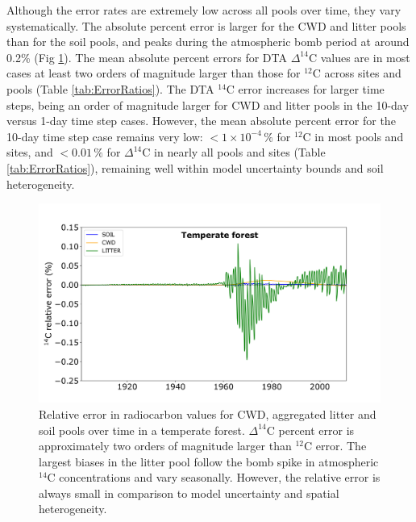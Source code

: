 \documentclass[11pt,a4paper]{article}
\begin{document}
Although the error rates are extremely low across all pools over time, they vary systematically. The absolute percent error is larger for the CWD and litter pools than for the soil pools, and peaks during the atmospheric bomb period at around 0.2\% (Fig \ref{fig:10dayErrorOverTime}). The mean absolute percent errors for DTA $\Delta^{14}$C values are in most cases at least two orders of magnitude larger than those for $^{12}$C across sites and pools (Table \ref{tab:ErrorRatios}). The DTA $^{14}$C error increases for larger time steps, being an order of magnitude larger for CWD and litter pools in the 10-day versus 1-day time step cases. However, the mean absolute percent error for the 10-day time step case remains very low: $< 1 \times 10^{-4}\,\%$ for $^{12}$C in most pools and sites, and $<0.01\,\%$ for $\Delta^{14}$C in nearly all pools and sites (Table \ref{tab:ErrorRatios}), remaining well within model uncertainty bounds and soil heterogeneity.

\begin{figure}[htbp]
        \centering 
        \includegraphics[width=1.0\linewidth]{figs/C14_through_time_rel_err_10_updatedLabel.png}
        \caption{Relative error in radiocarbon values for CWD, aggregated litter and soil pools over time in a temperate forest. $\Delta^{14}$C percent error is approximately two orders of magnitude larger than $^{12}$C error. The largest biases in the litter pool follow the bomb spike in atmospheric $^{14}$C concentrations and vary seasonally. However, the relative error is always small in comparison to model uncertainty and spatial heterogeneity.}
        \label{fig:10dayErrorOverTime}
\end{figure}    
\end{document}
